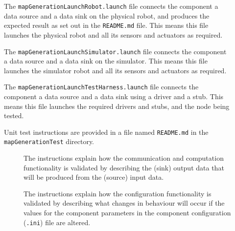 \documentclass{CSSRforAfrica}
\newcommand{\checkboxChecked}{\fbox{\ding{51}}} %
\newcommand{\checkboxDashed}{\fbox{--}}         %
\begin{document}
\begin{description}
\item[\checkboxDashed] The {\small \verb+mapGenerationLaunchRobot.launch+} file  connects the component a data source and a data sink on the physical robot, and produces the expected result as set out in the  {\small \verb+README.md+}  file.    This means this file launches the physical robot and all its sensors and actuators as required.

\item[\checkboxDashed] The {\small \verb+mapGenerationLaunchSimulator.launch+} file  connects the component a data source and a data sink on the simulator.   This means this file launches the simulator robot and all its sensors and actuators as required.

\item[\checkboxChecked] The {\small \verb+mapGenerationLaunchTestHarness.launch+} file  connects the component a data source and a data sink using a driver and a stub.   This means this file launches the required drivers and stubs, and the node being tested.

\item[\checkboxChecked] Unit test instructions are provided in a file named {\small \verb+README.md+} in the  {\small \verb+mapGenerationTest+} directory. 


\begin{description}

\item[\checkboxChecked] The instructions explain how the communication and computation functionality is validated by describing the (sink) output data that will be produced from the (source) input data.  

\item[\checkboxChecked] The instructions explain how the configuration functionality is validated by describing what changes in behaviour will occur if the values for the component parameters in the component configuration ({\small \verb+.ini+}) file are altered.

\end{description}

\end{description} 

  


  
%  
 
\end{document}
